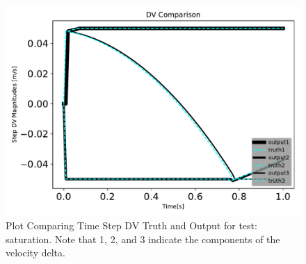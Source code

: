 \begin{figure}[htbp]\centerline{\includegraphics[height=0.7\textwidth, keepaspectratio]{AutoTeX/saturationDVcomparison}}\caption{Plot Comparing Time Step DV Truth and Output for test: saturation. Note that 1, 2, and 3 indicate the components of the velocity delta.}\label{fig:saturationDVcomparison}\end{figure}